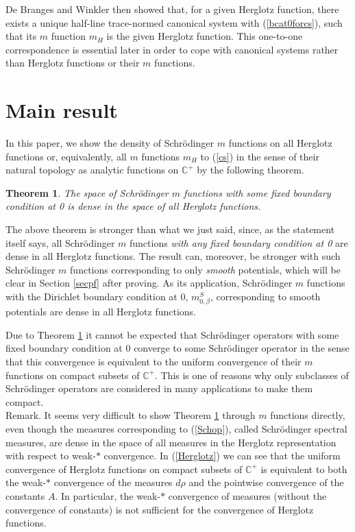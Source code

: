 \documentclass[preprint,12pt]{elsarticle}
\newtheorem{Theorem}{Theorem}[section]
\newcommand{\C}{{\mathbb C}}
\begin{document}
De Branges \cite{deB} and Winkler \cite{Win} then showed that, for a given Herglotz function, there exists a unique half-line trace-normed canonical system with (\ref{bcat0forcs}), such that its $m$ function $m_H$ is the given Herglotz function. This one-to-one correspondence is essential later in order to cope with canonical systems rather than Herglotz functions or their $m$ functions.\\

\section{Main result}\label{secDensity}
In this paper, we show the density of Schr\"odinger $m$ functions on all Herglotz functions or, equivalently, all  $m$ functions $m_H$ to (\ref{cs}) in the sense of their natural topology as analytic functions on $\C^+$ by the following theorem.

\begin{Theorem}\label{Density}
The space of Schr\"odinger $m$ functions with some fixed boundary condition at 0 is dense in the space of all Herglotz functions. 
\end{Theorem}

The above theorem is stronger than what we just said, since, as the statement itself says, all Schr\"odinger $m$ functions \textit{with any fixed boundary condition at 0} are dense in all Herglotz functions. The result can, moreover, be stronger with such Schr\"odinger $m$ functions corresponding to only \textit{smooth} potentials, which will be clear in Section \ref{secpf} after proving. As its application, Schr\"odinger $m$ functions with the Dirichlet boundary condition at 0, $m^S_{0,\beta}$, corresponding to smooth potentials are dense in all Herglotz functions. 
 
Due to Theorem \ref{Density} it cannot be expected that Schr\"odinger operators with some fixed boundary condition at 0 converge to some Schr\"odinger operator in the sense that this convergence is equivalent to the uniform convergence of their $m$ functions on compact subsets of $\C^+$. This is one of reasons why only subclasses of Schr\"odinger operators are considered in many applications to make them compact.\\

Remark. It seems very difficult to show Theorem \ref{Density} through $m$ functions directly, even though the measures corresponding to (\ref{Schop}), called Schr\"odinger spectral measures, are dense in the space of all measures in the Herglotz representation with respect to weak-$\ast$ convergence. In (\ref{Herglotz}) we can see that the uniform convergence of Herglotz functions on compact subsets of $\C^+$ is equivalent to both the weak-$*$ convergence of the measures $d\rho$ and the pointwise convergence of the constants $A$. In particular, the weak-$*$ convergence of measures (without the convergence of constants) is not sufficient for the convergence of Herglotz functions. 
\end{document}
